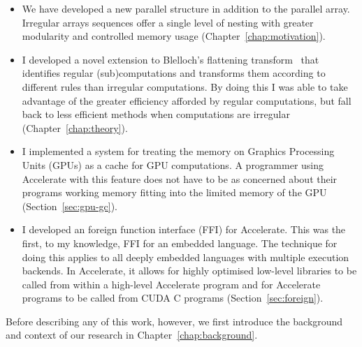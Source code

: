 \begin{itemize}
\item We have developed a new parallel structure in addition to the parallel array. Irregular arrays sequences offer a single level of nesting with greater modularity and controlled memory usage (Chapter~\ref{chap:motivation}).
\item I developed a novel extension to Blelloch's flattening transform~\cite{Blelloch:compiling1988,Blelloch:nesl1995} that identifies regular (sub)computations and transforms them according to different rules than irregular computations. By doing this I was able to take advantage of the greater efficiency afforded by regular computations, but fall back to less efficient methods when computations are irregular (Chapter~\ref{chap:theory}).
\item I implemented a system for treating the memory on Graphics Processing Units (GPUs) as a cache for GPU computations. A programmer using Accelerate with this feature does not have to be as concerned about their programs working memory fitting into the limited memory of the GPU (Section~\ref{sec:gpu-gc}).
\item I developed an foreign function interface (FFI) for Accelerate. This was the first, to my knowledge, FFI for an embedded language. The technique for doing this applies to all deeply embedded languages with multiple execution backends. In Accelerate, it allows for highly optimised low-level libraries to be called from within a high-level Accelerate program and for Accelerate programs to be called from CUDA C programs (Section~\ref{sec:foreign}).
\end{itemize}

Before describing any of this work, however, we first introduce the background and context of our research in Chapter~\ref{chap:background}.
